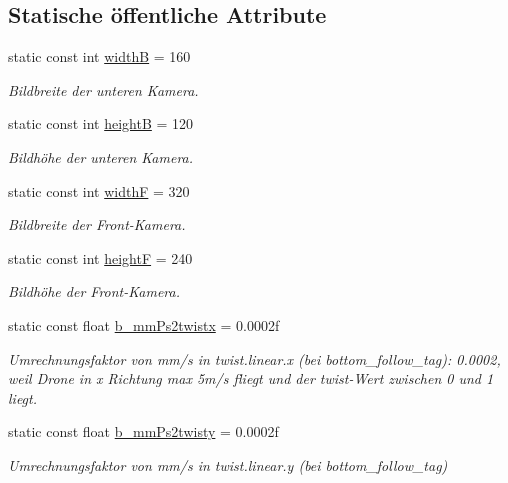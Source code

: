 \subsection*{Statische öffentliche Attribute}
\begin{DoxyCompactItemize}
\item 
static const int \hyperlink{class_cglobal_a931ff0dc06e16b267d22dd21570d686b}{widthB} = 160
\begin{DoxyCompactList}\small\item\em Bildbreite der unteren Kamera. \end{DoxyCompactList}\item 
static const int \hyperlink{class_cglobal_ade7cccb8bca50ca0e4740a4cecfb7498}{heightB} = 120
\begin{DoxyCompactList}\small\item\em Bildhöhe der unteren Kamera. \end{DoxyCompactList}\item 
static const int \hyperlink{class_cglobal_a95cebf066839488c61b4bc2f7fbf61c1}{widthF} = 320
\begin{DoxyCompactList}\small\item\em Bildbreite der Front-\/Kamera. \end{DoxyCompactList}\item 
static const int \hyperlink{class_cglobal_a601f81a0ed28e4e0ca387134ba76738e}{heightF} = 240
\begin{DoxyCompactList}\small\item\em Bildhöhe der Front-\/Kamera. \end{DoxyCompactList}\item 
static const float \hyperlink{class_cglobal_ab0b5362dfd6addba8455bd753aa18e37}{b\_\-mmPs2twistx} = 0.0002f
\begin{DoxyCompactList}\small\item\em Umrechnungsfaktor von mm/s in twist.linear.x (bei bottom\_\-follow\_\-tag): 0.0002, weil Drone in x Richtung max 5m/s fliegt und der twist-\/Wert zwischen 0 und 1 liegt. \end{DoxyCompactList}\item 
static const float \hyperlink{class_cglobal_aa70b2a6e29e8c452aab53cefaf77a01e}{b\_\-mmPs2twisty} = 0.0002f
\begin{DoxyCompactList}\small\item\em Umrechnungsfaktor von mm/s in twist.linear.y (bei bottom\_\-follow\_\-tag) \end{DoxyCompactList}\item 

\end{DoxyCompactItemize}
